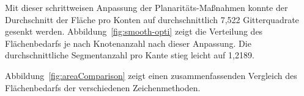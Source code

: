\documentclass[a4paper]{scrreprt}
\theoremstyle{definition}
\begin{document}
Mit dieser schrittweisen Anpassung der Planaritäts-Maßnahmen konnte der Durchschnitt der Fläche pro Konten auf durchschnittlich 7,522 Gitterquadrate gesenkt werden. Abbildung~\ref{fig:smooth-opti} zeigt die Verteilung des Flächenbedarfs je nach Knotenanzahl nach dieser Anpassung. Die durchschnittliche Segmentanzahl pro Kante stieg leicht auf 1,2189.

Abbildung~\ref{fig:areaComparison} zeigt einen zusammenfassenden Vergleich des Flächenbedarfs der verschiedenen Zeichenmethoden.






\end{document}
